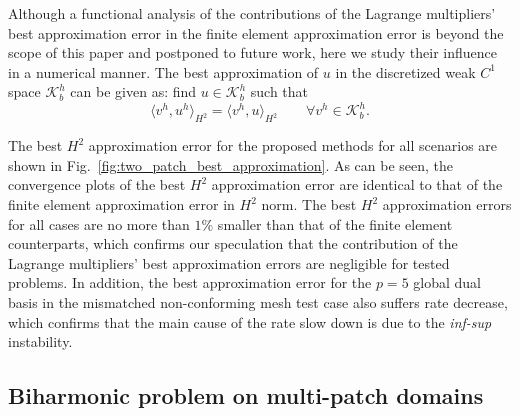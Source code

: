 \documentclass[preprint,12pt]{elsarticle}
\theoremstyle{remark}
\begin{document}
Although a functional analysis of the contributions of the Lagrange multipliers' best approximation error in the finite element approximation error is beyond the scope of this paper and postponed to future work, here we study their influence in a numerical manner. The best approximation of $u$ in the discretized weak $C^1$ space $\mathcal{K}_b^h$ can be given as: find $u\in\mathcal{K}_b^h$ such that
\begin{equation}
    \langle{v^h,u^h}\rangle_{H^2}= \langle{v^h,u}\rangle_{H^2}\quad\quad\forall{v^h\in\mathcal{K}_b^h}.
\end{equation}

The best $H^2$ approximation error for the proposed methods for all scenarios are shown in Fig.~\ref{fig:two_patch_best_approximation}. As can be seen, the convergence plots of the best $H^2$ approximation error are identical to that of the finite element approximation error in $H^2$ norm. The best $H^2$ approximation errors for all cases are no more than $1\%$ smaller than that of the finite element counterparts, which confirms our speculation that the contribution of the Lagrange multipliers' best approximation errors are negligible for tested problems. In addition, the best approximation error for the $p=5$ global dual basis in the mismatched non-conforming mesh test case also suffers rate decrease, which confirms that the main cause of the rate slow down is due to the \textit{inf-sup} instability.\par

\subsection{Biharmonic problem on multi-patch domains} \label{sec:multi-patch}
\end{document}
